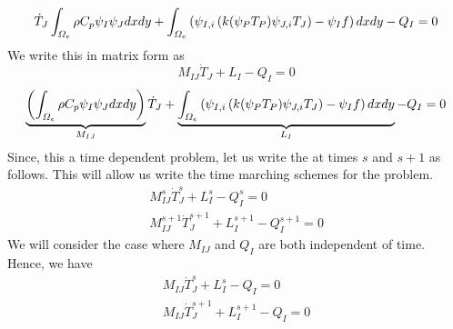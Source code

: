 \documentclass[preprint,12pt]{elsarticle}
\numberwithin{equation}{section}
\begin{document}
\begin{equation}
	\dot{T}_J	\int_{\Omega_e}\rho C_p \psi_I  \psi_J  dx dy + \int_{\Omega_e} \left( \psi_{I,i} \left( k (\psi_PT_P) \psi_{J,i}T_J \right) - \psi_I f \right)  dx dy -Q_I =0 \label{eq:wf8}
\end{equation}
We write this in matrix form as
\begin{equation}
	M_{IJ}\dot{T}_J + L_I - Q_I=0 \label{eq:matform}
\end{equation}
\begin{equation}
		\underbrace{\left( \int_{\Omega_e}\rho C_p \psi_I  \psi_J  dx dy \right)}_{M_{IJ}} \dot{T}_J + \underbrace{\int_{\Omega_e} \left( \psi_{I,i} \left( k (\psi_PT_P) \psi_{J,i}T_J \right) - \psi_I f \right)  dx dy}_{L_I} -Q_I = 0 \label{eq:matform2}
\end{equation}
Since, this a time dependent problem, let us write the  at times $s$ and $s+1$ as follows. This will allow us write the time marching schemes for the problem. 
\begin{eqnarray}
		M_{IJ}^s\dot{T}_J^{s} + L_I^{s} - Q_I^{s}=0 \label{eq:matofrm2} \\
		M_{IJ}^{s+1}\dot{T}_J^{s+1} + L_I^{s+1} - Q_I^{s+1}=0 \label{eq:matofrm3}
\end{eqnarray}
We will consider the case where $M_{IJ}$ and $Q_I$ are both independent of time. Hence, we have
\begin{eqnarray}
	M_{IJ}\dot{T}_J^{s} + L_I^{s} - Q_I=0 \label{eq:matofrm4} \\
	M_{IJ}\dot{T}_J^{s+1} + L_I^{s+1} - Q_I=0 \label{eq:matofrm5}
\end{eqnarray}
\end{document}
